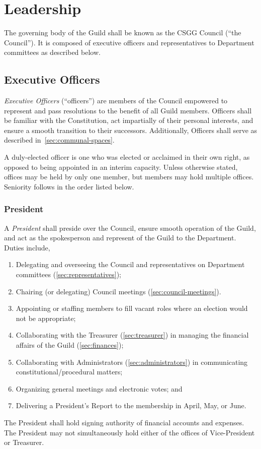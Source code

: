 \section{Leadership}

The governing body of the Guild shall be known as the CSGG Council (``the
Council''). It is composed of executive officers and representatives to
Department committees as described below.

\subsection{Executive Officers}\label{sec:officers-duties}

\textit{Executive Officers} (``officers'') are members of the Council empowered to represent and pass resolutions to the benefit of all Guild members. Officers shall be familiar with the Constitution, act impartially of their personal interests, and ensure a smooth transition to their successors. Additionally, Officers shall serve as described in~\ref{sec:communal-spaces}.

A duly-elected officer is one who was elected or acclaimed in their own right,
as opposed to being appointed in an interim capacity. Unless otherwise stated,
offices may be held by only one member, but members may hold multiple offices.
Seniority follows in the order listed below.

\subsubsection{President}

A \textit{President} shall preside over the Council, ensure smooth operation of
the Guild, and act as the spokesperson and represent of the Guild to the
Department. Duties include,

\begin{enumerate}
      \item Delegating and overseeing the Council and representatives on Department
            committees (\ref{sec:representatives});
      \item Chairing (or delegating) Council meetings (\ref{sec:council-meetings}).
      \item Appointing or staffing members to fill vacant roles where an election would not
            be appropriate;
      \item Collaborating with the Treasurer (\ref{sec:treasurer}) in managing the
            financial affairs of the Guild (\ref{sec:finances});
      \item Collaborating with Administrators (\ref{sec:administrators}) in communicating
            constitutional/procedural matters;
      \item Organizing general meetings and electronic votes; and
      \item Delivering a President's Report to the membership in April, May, or June.
\end{enumerate}
The President shall hold signing authority of financial accounts and expenses.
The President may not simultaneously hold either of the offices of
Vice-President or Treasurer.

